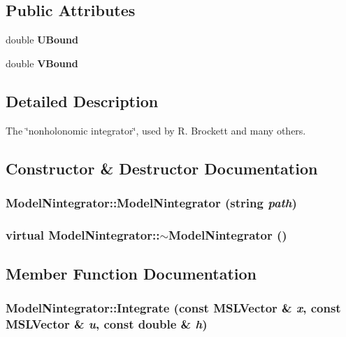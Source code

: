 \subsection*{Public Attributes}
\begin{CompactItemize}
\item 
double {\bf UBound}
\item 
double {\bf VBound}
\end{CompactItemize}


\subsection{Detailed Description}
The \char`\"{}nonholonomic integrator\char`\"{}, used by R. Brockett and many others.



\subsection{Constructor \& Destructor Documentation}
\subsubsection{\setlength{\rightskip}{0pt plus 5cm}Model\-Nintegrator::Model\-Nintegrator (string {\em path})}\label{classModelNintegrator_a0}


\subsubsection{\setlength{\rightskip}{0pt plus 5cm}virtual Model\-Nintegrator::$\sim$Model\-Nintegrator ()\hspace{0.3cm}{\tt  [inline, virtual]}}\label{classModelNintegrator_a1}




\subsection{Member Function Documentation}
\subsubsection{ Model\-Nintegrator::Integrate (const {\bf MSLVector} \& {\em x}, const {\bf MSLVector} \& {\em u}, const double \& {\em h})\hspace{0.3cm}{\tt  [virtual]}}\label{classModelNintegrator_a3}


